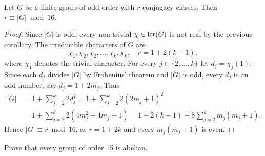 \begin{theorem}[Burnside]
  \label{thm:Burnside_mod16}
  Let $G$ be a finite group of odd order 
  with $r$ conjugacy classes. Then
  $r\equiv|G|\bmod{16}$.
\end{theorem}

\begin{proof}
  Since $|G|$ is odd, every non-trivial $\chi\in\operatorname{Irr}(G)$ is not real by
  the previous corollary. The irreducible characters 
  of $G$ are  
  \[
    \chi_1,\chi_2,\overline{\chi_2},\dots,\chi_k,\overline{\chi_k},
    \quad
    r=1+2(k-1),
  \]
  where $\chi_1$ denotes the trivial character. 
  For every $j\in\{2,\dots,k\}$ let $d_j=\chi_j(1)$. 
  Since each $d_j$ divides 
  $|G|$ by Frobenius' theorem and  $|G|$ is odd, 
  every $d_j$ is an odd number, 
  say $d_j=1+2m_j$. Thus  
  \begin{align*}
    |G|&=1+\sum_{j=2}^k 2d_j^2=1+\sum_{j=2}^k2(2m_j+1)^2\\
    &=1+\sum_{j=2}^k2(4m_j^2+4m_j+1)
    =1+2(k-1)+8\sum_{j=2}^km_j(m_j+1).
  \end{align*}
  Hence $|G|\equiv r\bmod{16}$, 
  as $r=1+2k$ and every $m_j(m_j+1)$ is even. 
\end{proof}

\begin{exercise}
    Prove that every group of order 15 is abelian. 
\end{exercise}

